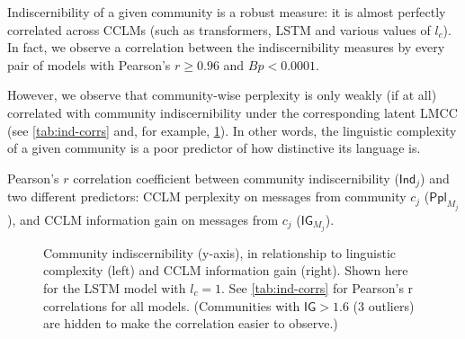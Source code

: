 \documentclass[11pt]{article}
\newcommand\Ppl{\mathsf{Ppl}}
\newcommand\IG{\mathsf{IG}}
\newcommand\Ind{\mathsf{Ind}}
\begin{document}
Indiscernibility of a given community is a robust measure: it is
almost perfectly correlated across CCLMs (such as transformers, LSTM
and various values of $l_c$).  In fact, we observe a correlation
between the indiscernibility measures by every pair of models with
Pearson's $r \geq 0.96$ and $Bp < 0.0001$. 

However, we observe that community-wise perplexity is only weakly (if at all) 
correlated with community indiscernibility under the corresponding latent 
LMCC (see \cref{tab:ind-corrs} and, for example, \cref{fig:cclm-lmcc-ppl}).
In other words, the linguistic complexity of a given community
is a poor predictor of how distinctive its language is.
%
\begin{table}
  \small
  \centering
  
  \caption{ Pearson's $r$ correlation coefficient between community
    indiscernibility ($\Ind_j$) and two different predictors: CCLM
    perplexity on messages from community $c_j$ ($\Ppl_{M_j}$), and
    CCLM information gain on messages from $c_j$ ($\IG_{M_j}$).  }
  \label{tab:ind-corrs}
\end{table}

\begin{figure}
  \caption{%
    Community indiscernibility (y-axis), 
    in relationship to linguistic complexity (left) and 
    CCLM information gain (right). Shown here for the LSTM
    model with $l_c=1$. See \cref{tab:ind-corrs} for 
    Pearson's r correlations for all models.
    (Communities with \(\IG > 1.6\) (3 outliers) are hidden to make the correlation easier to observe.)
  }
  \label{fig:cclm-lmcc-ppl}
\end{figure}
\end{document}
